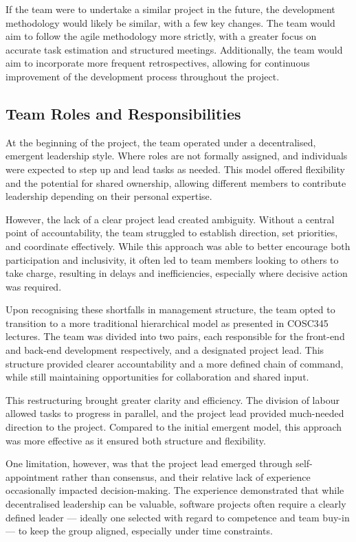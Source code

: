 \documentclass[conference]{IEEEtran}
\begin{document}
If the team were to undertake a similar project in the future, the development methodology would likely be similar, with a few key changes. The team would aim to follow the agile methodology more strictly, with a greater focus on accurate task estimation and structured meetings. Additionally, the team would aim to incorporate more frequent retrospectives, allowing for continuous improvement of the development process throughout the project.

\subsection{Team Roles and Responsibilities}
At the beginning of the project, the team operated under a decentralised, emergent leadership style. Where roles are not formally assigned, and individuals were expected to step up and lead tasks as needed. This model offered flexibility and the potential for shared ownership, allowing different members to contribute leadership depending on their personal expertise.

However, the lack of a clear project lead created ambiguity. Without a central point of accountability, the team struggled to establish direction, set priorities, and coordinate effectively. While this approach was able to better encourage both participation and inclusivity, it often led to team members looking to others to take charge, resulting in delays and inefficiencies, especially where decisive action was required.

Upon recognising these shortfalls in management structure, the team opted to transition to a more traditional hierarchical model as presented in COSC345 lectures. The team was divided into two pairs, each responsible for the front-end and back-end development respectively, and a designated project lead. This structure provided clearer accountability and a more defined chain of command, while still maintaining opportunities for collaboration and shared input.

This restructuring brought greater clarity and efficiency. The division of labour allowed tasks to progress in parallel, and the project lead provided much-needed direction to the project. Compared to the initial emergent model, this approach was more effective as it ensured both structure and flexibility. 

One limitation, however, was that the project lead emerged through self-appointment rather than consensus, and their relative lack of experience occasionally impacted decision-making. The experience demonstrated that while decentralised leadership can be valuable, software projects often require a clearly defined leader — ideally one selected with regard to competence and team buy-in — to keep the group aligned, especially under time constraints.
\end{document}
